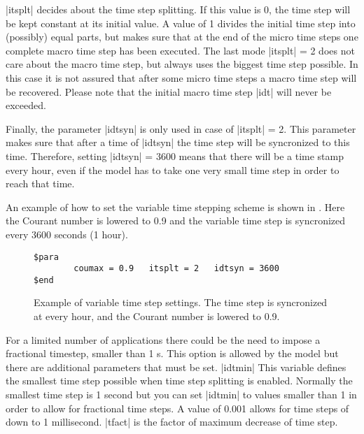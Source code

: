 |itsplt| decides about the time step splitting.  If this value is 0,
the time step will be kept constant at its initial value. A value of 1
divides the initial time step into (possibly) equal parts, but makes sure
that at the end of the micro time steps one complete macro time step has
been executed. The last mode |itsplt| = 2 does not care about the macro
time step, but always uses the biggest time step possible. In this case
it is not assured that after some micro time steps a macro time step
will be recovered. Please note that the initial macro time step |idt|
will never be exceeded.

Finally, the parameter |idtsyn| is only used in case of |itsplt| = 2.
This parameter makes sure that after a time of |idtsyn| the time step
will be syncronized to this time. Therefore, setting |idtsyn| = 3600
means that there will be a time stamp every hour, even if the model has
to take one very small time step in order to reach that time.

An example of how to set the variable time stepping scheme is shown
in \Fig{}. Here the Courant number is lowered to 0.9 and
the variable time step is syncronized every 3600 seconds (1 hour).

\begin{figure}[ht]
\begin{verbatim}
$para
        coumax = 0.9   itsplt = 2   idtsyn = 3600
$end
\end{verbatim}
\caption{Example of variable time step settings. The time step is syncronized
at every hour, and the Courant number is lowered to 0.9.}
\label{fig:vartime}
\end{figure}

For a limited number of applications there could be the need to impose a fractional timestep, smaller than 1 s. This option is allowed by the model but there are additional parameters that must be set.
|idtmin| This variable defines the smallest time step possible when time step splitting is enabled. Normally the smallest time step is 1 second but you can set |idtmin| to values smaller than 1 in order to allow for fractional time steps. A value of 0.001 allows for time steps of down to 1 millisecond.
|tfact| is the factor of maximum decrease of time step.